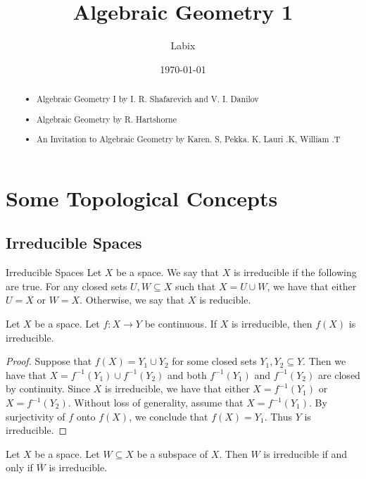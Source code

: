 \documentclass[a4paper]{article}
\title{Algebraic Geometry 1}
\author{Labix}
\date{\today}
\begin{document}
\maketitle
\begin{abstract}
\begin{itemize}
\item Algebraic Geometry I by I. R. Shafarevich and V. I. Danilov
\item Algebraic Geometry by R. Hartshorne
\item An Invitation to Algebraic Geometry by Karen. S, Pekka. K, Lauri .K, William .T
\end{itemize}
\end{abstract}
\pagebreak
\tableofcontents

\pagebreak
\section{Some Topological Concepts}
\subsection{Irreducible Spaces}
\begin{defn}{Irreducible Spaces}{} Let $X$ be a space. We say that $X$ is irreducible if the following are true. For any closed sets $U,W\subseteq X$ such that $X=U\cup W$, we have that either $U=X$ or $W=X$. Otherwise, we say that $X$ is reducible. 
\end{defn}

\begin{prp}{}{} Let $X$ be a space. Let $f:X\to Y$ be continuous. If $X$ is irreducible, then $f(X)$ is irreducible. \tcbline
\begin{proof}
Suppose that $f(X)=Y_1\cup Y_2$ for some closed sets $Y_1,Y_2\subseteq Y$. Then we have that $X=f^{-1}(Y_1)\cup f^{-1}(Y_2)$ and both $f^{-1}(Y_1)$ and $f^{-1}(Y_2)$ are closed by continuity. Since $X$ is irreducible, we have that either $X=f^{-1}(Y_1)$ or $X=f^{-1}(Y_2)$. Without loss of generality, assume that $X=f^{-1}(Y_1)$. By surjectivity of $f$ onto $f(X)$, we conclude that $f(X)=Y_1$. Thus $Y$ is irreducible. 
\end{proof}
\end{prp}

\begin{lmm}{}{} Let $X$ be a space. Let $W\subseteq X$ be a subspace of $X$. Then $W$ is irreducible if and only if $\overline{W}$ is irreducible. 
\end{lmm}
\end{document}
